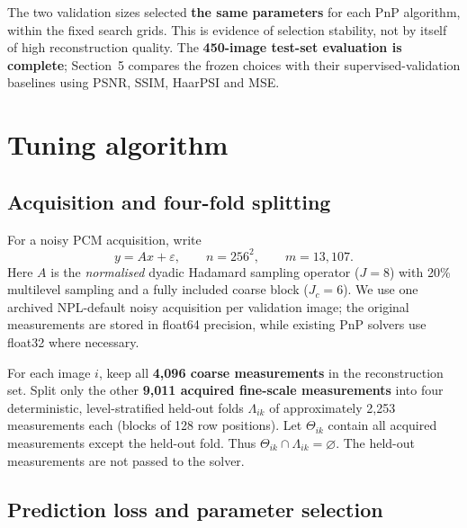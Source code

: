 \documentclass[a4paper,10pt]{article}
\begin{document}
The two validation sizes selected \textbf{the same parameters} for each PnP algorithm, within the fixed search grids. This is evidence of selection stability, not by itself of high reconstruction quality. The \textbf{450-image test-set evaluation is complete}; Section~5 compares the frozen choices with their supervised-validation baselines using PSNR, SSIM, HaarPSI and MSE.

\section{Tuning algorithm}

\subsection*{Acquisition and four-fold splitting}

For a noisy PCM acquisition, write
\begin{equation}
 y=Ax+\varepsilon,\qquad n=256^2,\qquad m=13{,}107.
\end{equation}
Here $A$ is the \emph{normalised} dyadic Hadamard sampling operator ($J=8$) with 20\% multilevel sampling and a fully included coarse block ($J_c=6$). We use one archived NPL-default noisy acquisition per validation image; the original measurements are stored in float64 precision, while existing PnP solvers use float32 where necessary.

For each image $i$, keep all \textbf{4,096 coarse measurements} in the reconstruction set. Split only the other \textbf{9,011 acquired fine-scale measurements} into four deterministic, level-stratified held-out folds $\Lambda_{ik}$ of approximately 2,253 measurements each (blocks of 128 row positions). Let $\Theta_{ik}$ contain all acquired measurements except the held-out fold. Thus $\Theta_{ik}\cap\Lambda_{ik}=\varnothing$. The held-out measurements are not passed to the solver.

\subsection*{Prediction loss and parameter selection}
\end{document}
